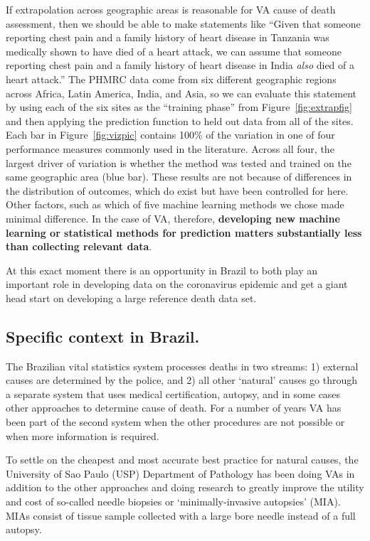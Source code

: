 \documentclass[12pt]{article}
\begin{document}
If extrapolation across geographic areas is reasonable for VA cause of death assessment, then we should be able to make statements like ``Given that someone reporting chest pain and a family history of heart disease in Tanzania was medically shown to have died of a heart attack, we can assume that someone reporting chest pain and a family history of heart disease in India \textit{also} died of a heart attack.'' The PHMRC data come from six different geographic regions across Africa, Latin America, India, and Asia, so we can evaluate this statement by 
using each of the six sites as the ``training phase'' from Figure~\ref{fig:extrapfig} and then applying the prediction function to held out data from all of the sites. Each bar in Figure~\ref{fig:vizpic} contains 100\% of the variation in one of four performance measures commonly used in the literature.  Across all four, the largest driver of variation is whether the method was tested and trained on the same geographic area (blue bar).  These results are not because of differences in the distribution of outcomes, which do exist but have been controlled for here.  Other factors, such as which of five machine learning methods we chose made minimal difference.  In the case of VA, therefore, {\bf developing new machine learning or statistical methods for prediction matters substantially less than collecting relevant data}.  

At this exact moment there is an opportunity in Brazil to both play an important role in developing data on the coronavirus epidemic and get a giant head start on developing a large reference death data set.


\subsection{Specific context in Brazil.}

The Brazilian vital statistics system processes deaths in two streams: 1) external causes are determined by the police, and 2) all other `natural' causes go through a separate system that uses medical certification, autopsy, and in some cases other approaches to determine cause of death.  For a number of years VA has been part of the second system when the other procedures are not possible or when more information is required.

To settle on the cheapest and most accurate best practice for natural causes, the University of Sao Paulo (USP) Department of Pathology has been doing VAs in addition to the other approaches and doing research to greatly improve the utility and cost of so-called needle biopsies or `minimally-invasive autopsies' (MIA).  MIAs consist of tissue sample collected with a large bore needle instead of a full autopsy.
\end{document}
